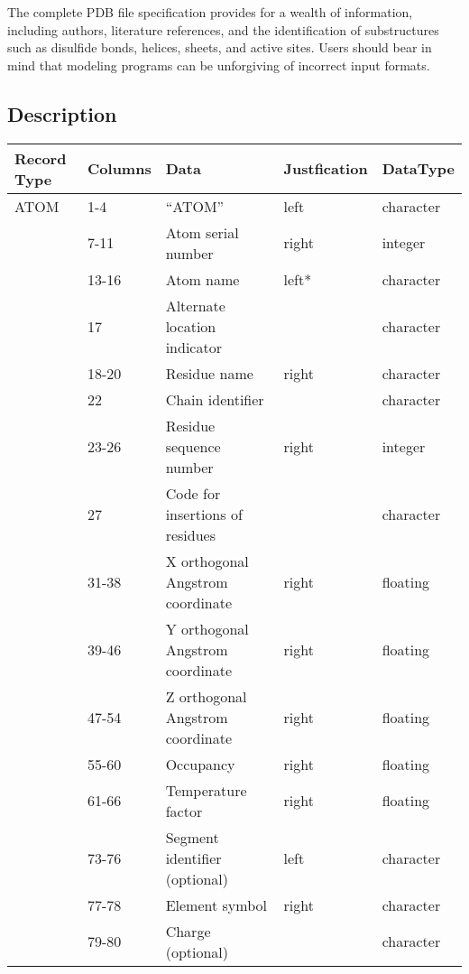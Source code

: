 \documentclass[letterpaper,10pt,english]{sphinxmanual}
\begin{document}
The complete PDB file specification provides for a wealth of information, including authors, literature
references, and the identification of substructures such as disulfide bonds, helices, sheets, and active
sites. Users should bear in mind that modeling programs can be unforgiving of incorrect input formats.


\subsection{Description}
\label{documentation_pages/file_format:description}
\begin{tabulary}{\linewidth}{|L|L|L|L|L|}
\hline
\textbf{
Record Type
} & \textbf{
Columns
} & \textbf{
Data
} & \textbf{
Justfication
} & \textbf{
DataType
}\\
\hline

ATOM
 & 
1-4
 & 
``ATOM''
 & 
left
 & 
character
\\
 & 
7-11
 & 
Atom serial number
 & 
right
 & 
integer
\\
 & 
13-16
 & 
Atom name
 & 
left*
 & 
character
\\
 & 
17
 & 
Alternate location indicator
 &  & 
character
\\
 & 
18-20
 & 
Residue name
 & 
right
 & 
character
\\
 & 
22
 & 
Chain identifier
 &  & 
character
\\
 & 
23-26
 & 
Residue sequence number
 & 
right
 & 
integer
\\
 & 
27
 & 
Code for insertions of residues
 &  & 
character
\\
 & 
31-38
 & 
X orthogonal Angstrom coordinate
 & 
right
 & 
floating
\\
 & 
39-46
 & 
Y orthogonal Angstrom coordinate
 & 
right
 & 
floating
\\
 & 
47-54
 & 
Z orthogonal Angstrom coordinate
 & 
right
 & 
floating
\\
 & 
55-60
 & 
Occupancy
 & 
right
 & 
floating
\\
 & 
61-66
 & 
Temperature factor
 & 
right
 & 
floating
\\
 & 
73-76
 & 
Segment identifier (optional)
 & 
left
 & 
character
\\
 & 
77-78
 & 
Element symbol
 & 
right
 & 
character
\\
 & 
79-80
 & 
Charge (optional)
 &  & 
character
\\
\hline
\end{tabulary}
\end{document}
